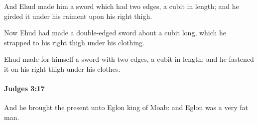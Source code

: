 			\begin{versebox}
					\item[BHS] 
					\item[ASV] And Ehud made him a sword which had two edges, a cubit in length; and he girded it under his raiment upon his right thigh.
					\item[NIV] Now Ehud had made a double-edged sword about a cubit long, which he strapped to his right thigh under his clothing.
					\item[NRSV] Ehud made for himself a sword with two edges, a cubit in length; and he fastened it on his right thigh under his clothes.
			\end{versebox}

		\paragraph{Judges 3:17} %
			\label{JUDGES-3-17}

			And he brought the present unto Eglon king of Moab: and Eglon was a very fat man.

